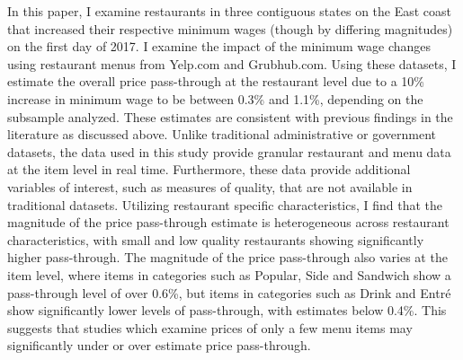 \documentclass[11pt]{article}
\begin{document}
In this paper, I examine restaurants in three contiguous states on the East coast that increased their respective minimum wages (though by differing magnitudes) on the first day of 2017. I examine the impact of the minimum wage changes using restaurant menus from Yelp.com and Grubhub.com. Using these datasets, I estimate the overall price pass-through at the restaurant level due to a 10\% increase in minimum wage to be between 0.3\% and 1.1\%, depending on the subsample analyzed. These estimates are consistent with previous findings in the literature as discussed above. Unlike traditional administrative or government datasets, the data used in this study provide granular restaurant and menu data at the item level in real time. Furthermore, these data provide additional variables of interest, such as measures of quality, that are not available in traditional datasets. Utilizing restaurant specific characteristics, 
I find that the magnitude of the price pass-through estimate is heterogeneous across restaurant characteristics, with small and low quality restaurants showing significantly higher pass-through. The magnitude of the price pass-through also varies at the item level, where items in categories such as Popular, Side and Sandwich show a pass-through level of over 0.6\%, but items in categories such as Drink and Entr\'e show significantly lower levels of pass-through, with estimates below 0.4\%. This suggests that studies which examine prices of only a few menu items may significantly under or over estimate price pass-through. 
\end{document}
